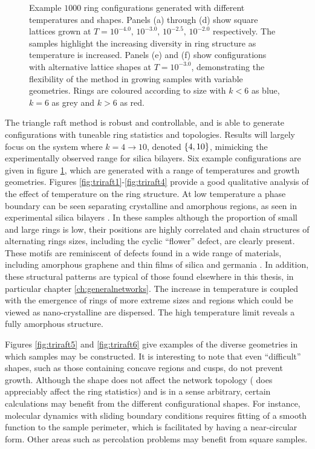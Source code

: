 \begin{figure}[p]
     \caption{Example $1000$ ring configurations generated with different temperatures and shapes. Panels (a) through (d) show square lattices grown at $T=10^{-4.0},\,10^{-3.0},\,10^{-2.5},\, 10^{-2.0}$ respectively. The samples highlight the increasing diversity in ring structure as temperature is increased. Panels (e) and (f) show configurations with alternative lattice shapes at $T=10^{-3.0}$, demonstrating the flexibility of the method in growing samples with variable geometries. Rings are coloured according to size with $k<6$ as blue, $k=6$ as grey and $k>6$ as red.}
     \label{fig:triraft}
\end{figure} 
 
The triangle raft method is robust and controllable, and is able to generate configurations with tuneable ring statistics and topologies.
Results will largely focus on the system where $k=4\rightarrow10$, denoted $\left\{4,10\right\}$, mimicking the experimentally observed range for silica bilayers. 
Six example configurations are given in figure \ref{fig:triraft}, which are generated with a range of temperatures and growth geometries. 
Figures \ref{fig:triraft1}\--\ref{fig:triraft4} provide a good qualitative analysis of the effect of temperature on the ring structure. 
At low temperature a phase boundary can be seen separating crystalline and amorphous regions, as seen in experimental silica bilayers \cite{Lichtenstein2012b}. 
In these samples although the proportion of small and large rings is low, their positions are highly correlated and chain structures of alternating rings sizes, including the cyclic ``flower'' defect, are clearly present. 
These motifs are reminiscent of defects found in a wide range of materials, including amorphous graphene and thin films of silica and germania \cite{Bjorkman2013,Robertson2012,Buchner2017,Lewandowski2018}. 
In addition, these structural patterns are typical of those found elsewhere in this thesis, in particular chapter \ref{ch:generalnetworks}.
The increase in temperature is coupled with the emergence of rings of more extreme sizes and regions which could be viewed as nano\--crystalline are dispersed. 
The high temperature limit reveals a fully amorphous structure.

Figures \ref{fig:triraft5} and \ref{fig:triraft6} give examples of the diverse geometries in which samples may be constructed. 
It is interesting to note that even ``difficult'' shapes, such as those containing concave regions and cusps, do not prevent growth.  
Although the shape does not affect the network topology (\ie{} does appreciably affect the ring statistics) and is in a sense arbitrary, certain calculations may benefit from the different configurational shapes. 
For instance, molecular dynamics with sliding boundary conditions requires fitting of a smooth function to the sample perimeter, which is facilitated by having a near\--circular form.
Other areas such as percolation problems may benefit from square samples.

